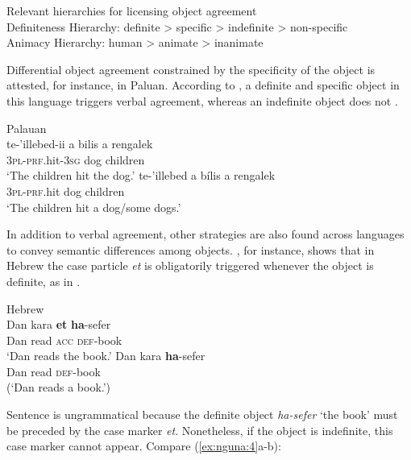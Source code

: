 \documentclass[output=paper]{langsci/langscibook}
\begin{document}
\ea\label{ex:nguna:1}
{Relevant hierarchies for licensing object agreement}\\
\ea\label{ex:nguna:}
  \textup{Definiteness Hierarchy: definite > specific > indefinite > non-specific}\\
\ex 
\textup{Animacy Hierarchy: human > animate > inanimate}\\
\z
\z

Differential object agreement constrained by the specificity of the object is attested, for instance, in Paluan. According to \citet[218]{Woolford2000}, a definite and specific object in this language triggers verbal agreement, whereas an indefinite object does not .

\ea\label{ex:nguna:2}
\ea
{Palauan {\citep[30]{Georgopoulos1991}}}\\
\gll te-’illebed-ii             {a bilis}          {a rengalek}\\
     \textsc{3pl-prf}.hit-\textsc{3sg}        {dog}              {children}\\
\glt ‘The children hit the dog.’
\ex
\gll te-’illebed           {a bílis}         {a rengalek}\\
     \textsc{3}{\textsc{pl}}-{\textsc{prf}}.hit         dog             children\\
\glt ‘The children hit a dog/some dogs.’
\z
\z



In addition to verbal agreement, other strategies are also found across languages to convey semantic differences among objects. \citet{Danon2002}, for instance, shows that in Hebrew the case particle {\textit{et}} is obligatorily triggered whenever the object is definite, as in .


\ea\label{ex:nguna:3}
{Hebrew \citep[1]{Danon2002}}\\
\ea
\gll Dan       kara       \textbf{et}       \textbf{ha}-sefer\\
     Dan       read       \textsc{acc}     \textsc{def}-book\\
\glt ‘Dan reads the book.’
\ex\label{ex:nguna:3b}
\gll *Dan       kara              \textbf{ha}-sefer\\
     Dan         read              \textsc{def}-book\\
\glt (‘Dan reads a book.’)
\z
\z



Sentence  is ungrammatical because the definite object {\textit{ha-sefer}} ‘the book’ must be preceded by the case marker {\textit{et}}. Nonetheless, if the object is indefinite, this case marker cannot appear. Compare (\ref{ex:nguna:4}a-b):
\end{document}
